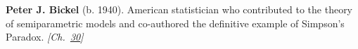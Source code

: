 \textbf{Peter J. Bickel} (b. 1940). American statistician who contributed to the theory of semiparametric models and co-authored the definitive example of Simpson's Paradox. \emph{[Ch.~\hyperref[ch:simpsonsparadox]{30}]}

